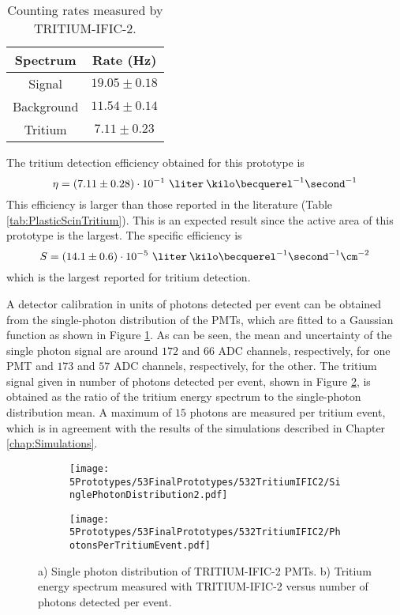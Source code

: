 \begin{table}[htbp]
\centering{}%
\begin{tabular}{cc}
\toprule 
Spectrum & Rate (Hz) \tabularnewline
\midrule
\midrule 
Signal & $19.05 \pm 0.18$ \tabularnewline
Background & $11.54 \pm 0.14$ \tabularnewline  
Tritium & $7.11 \pm 0.23$ \tabularnewline
\bottomrule
\end{tabular}
\caption{Counting rates measured by TRITIUM-IFIC-2.}
\label{tab:CountsPerSecondTRITIUMIFIC2}
\end{table}
The tritium detection efficiency obtained for this prototype is $$\eta = (7.11 \pm 0.28)\cdot{} 10^{-1}~\liter\:\kilo\becquerel^{-1}\second^{-1}$$ 
This efficiency is larger than those reported in the literature (Table \ref{tab:PlasticScinTritium}). This is an expected result since the active area of this prototype is the largest. The specific efficiency is
$$S=(14.1 \pm 0.6)\cdot{} 10^{-5}~\liter\:\kilo\becquerel^{-1}\second^{-1}\cm^{-2}$$
which is the largest reported for tritium detection. 

A detector calibration in units of photons detected per event can be obtained from the single-photon distribution of the PMTs, which are fitted to a Gaussian function as shown in Figure \ref{subfig:SinglePhotonDistributionIFIC2}. As can be seen, the mean and uncertainty of the single photon signal are around $172$ and $66$ ADC channels, respectively, for one PMT and $173$ and $57$ ADC channels, respectively, for the other. The tritium signal given in number of photons detected per event, shown in Figure \ref{subfig:TritiumSignalTRITIUMIFIC2}, is obtained as the ratio of the tritium energy spectrum to the single-photon distribution mean. A maximum of $15$ photons are measured per tritium event, which is in agreement with the results of the simulations described in Chapter \ref{chap:Simulations}. 

\begin{figure}
\centering
    \begin{subfigure}[b]{0.73\textwidth}
    \centering
    \texttt{[image: 5Prototypes/53FinalPrototypes/532TritiumIFIC2/SinglePhotonDistribution2.pdf]}  
    \caption{\label{subfig:SinglePhotonDistributionIFIC2}}
    \end{subfigure}
    \hfill
    \begin{subfigure}[b]{0.73\textwidth}
    \centering
    \texttt{[image: 5Prototypes/53FinalPrototypes/532TritiumIFIC2/PhotonsPerTritiumEvent.pdf]}  
    \caption{\label{subfig:TritiumSignalTRITIUMIFIC2}}
    \end{subfigure}
 \caption{a) Single photon distribution of TRITIUM-IFIC-2 PMTs. b) Tritium energy spectrum measured with TRITIUM-IFIC-2 versus number of photons detected per event.}
 \label{fig:PhotonsPerTritiumEventIFIC2}
\end{figure}


